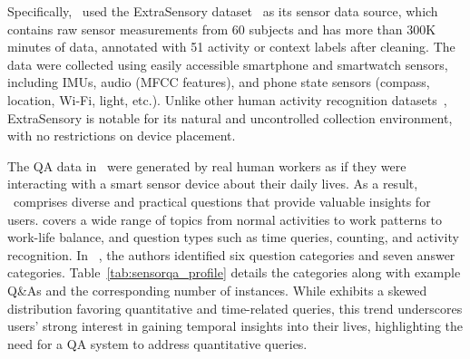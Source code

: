 Specifically, \Dataset~\citesensorqa used the ExtraSensory dataset~\cite{vaizman2017recognizing,vaizman2018context} as its sensor data source, which contains raw sensor measurements from 60 subjects and has more than 300K minutes of data, annotated with 51 activity or context labels after cleaning. The data were collected using easily accessible smartphone and smartwatch sensors, including IMUs, audio (MFCC features), and phone state sensors (compass, location, Wi-Fi, light, etc.). Unlike other human activity recognition datasets~\cite{misc_human_activity_recognition_using_smartphones_240,misc_mhealth_dataset_319,misc_opportunity_activity_recognition_226,ouyang2023harmony}, ExtraSensory is notable for its natural and uncontrolled collection environment, with no restrictions on device placement.

The QA data in \Dataset~\citesensorqa were generated by real human workers as if they were interacting with a smart sensor device about their daily lives. %
As a result, \Dataset~\citesensorqa comprises diverse and practical questions that provide valuable insights for users. \Dataset covers a wide range of topics from normal activities to work patterns to work-life balance, and question types such as time queries, counting, and activity recognition.
In \Dataset~\citesensorqa, the authors identified six question categories and seven answer categories.
Table~\ref{tab:sensorqa_profile} details the categories along with example Q\&As and the corresponding number of instances. 
While \Dataset exhibits a skewed distribution favoring quantitative and time-related queries, this trend underscores users' strong interest in gaining temporal insights into their lives, highlighting the need for a QA system to address quantitative queries.

